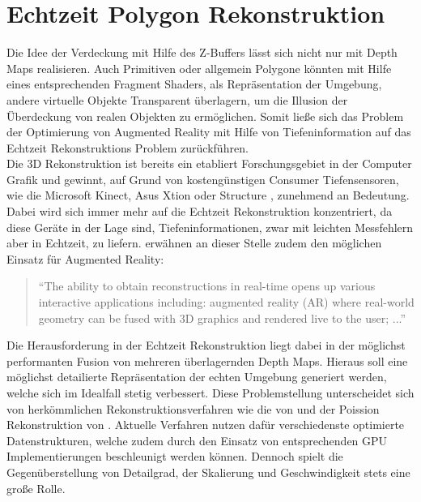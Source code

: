 \section{Echtzeit Polygon Rekonstruktion} \label{sec:polygon_reconstruction}

Die Idee der Verdeckung mit Hilfe des Z-Buffers lässt sich nicht nur mit Depth Maps realisieren. Auch Primitiven oder allgemein Polygone könnten mit Hilfe eines entsprechenden Fragment Shaders, als Repräsentation der Umgebung, andere virtuelle Objekte Transparent überlagern, um die Illusion der Überdeckung von realen Objekten zu ermöglichen. Somit ließe sich das Problem der Optimierung von Augmented Reality mit Hilfe von Tiefeninformation auf das Echtzeit Rekonstruktions Problem zurückführen. \\

Die 3D Rekonstruktion ist bereits ein etabliert Forschungsgebiet in der Computer Grafik und gewinnt, auf Grund von kostengünstigen Consumer Tiefensensoren, wie die Microsoft Kinect, Asus Xtion oder Structure \citep{Struc48:online}, zunehmend an Bedeutung. Dabei wird sich immer mehr auf die Echtzeit Rekonstruktion konzentriert, da diese Geräte in der Lage sind, Tiefeninformationen, zwar mit leichten Messfehlern aber in Echtzeit, zu liefern. \citet{niessner2013real} erwähnen an dieser Stelle zudem den möglichen Einsatz für Augmented Reality:

\begin{quote}
\enquote{The ability to obtain reconstructions
in real-time opens up various interactive applications including:
augmented reality (AR) where real-world geometry can be fused
with 3D graphics and rendered live to the user; ...} \citep{niessner2013real}
\end{quote}

Die Herausforderung in der Echtzeit Rekonstruktion liegt dabei in der möglichst performanten Fusion von mehreren überlagernden Depth Maps. Hieraus soll eine möglichst detailierte Repräsentation der echten Umgebung generiert werden, welche sich im Idealfall stetig verbessert. Diese Problemstellung unterscheidet sich von herkömmlichen Rekonstruktionsverfahren wie die von \citet{hoppe1992surface} und der Poission Rekonstruktion von \citet{kazhdan2006poisson}. Aktuelle Verfahren nutzen dafür verschiedenste optimierte Datenstrukturen, welche zudem durch den Einsatz von entsprechenden GPU Implementierungen beschleunigt werden können. Dennoch spielt die Gegenüberstellung von Detailgrad, der Skalierung und Geschwindigkeit stets eine große Rolle. \citet{niessner2013real} \\

